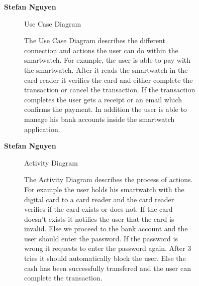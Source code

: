 \documentclass{article}
\begin{document}
	\begin{figure}[htbp]
		\textbf{Stefan Nguyen}
		\centering
		\begin{subfigure}{\textwidth}
			\resizebox{\textwidth}{!}{}
			\caption{Use Case Diagram}
		\end{subfigure}
		\begin{subfigure}{\textwidth}
			The Use Case Diagram describes the different connection and actions the user can do within the smartwatch. For example, 
			the user is able to pay with the smartwatch. After it reads the smartwatch in the card reader it verifies the card and 
			either complete the transaction or cancel the transaction. If the transaction completes the user gets a receipt or an 
			email which confirms the payment. In addition the user is able to manage his bank accounts inside the smartwatch application. 
		\end{subfigure}
	\end{figure}
	\clearpage

	\begin{figure}[htbp]
		\textbf{Stefan Nguyen}
		\centering
		\begin{subfigure}{\textwidth}
			\resizebox{\textwidth}{!}{}
			\caption{Activity Diagram}
		\end{subfigure}
		\begin{subfigure}{\textwidth}
			The Activity Diagram describes the process of actions. For example the user holds his smartwatch with the digital card
			to a card reader and the card reader verifies if the card exists or does not. If the card doesn't exists it notifies
			the user that the card is invalid. Else we proceed to the bank account and the user should enter the password. If the 
			password is wrong it requests to enter the password again. After 3 tries it should automatically block the user. Else the 
			cash has been successfully transfered and the user can complete the transaction. 
		\end{subfigure}
	\end{figure}
	\clearpage
\end{document}
